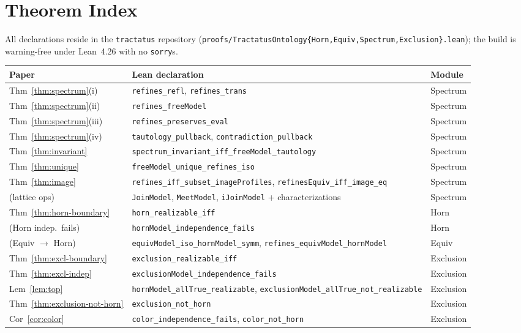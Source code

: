\documentclass[10pt, letterpaper]{article}
\theoremstyle{remark}
\newcommand{\lean}[1]{\texttt{#1}}
\begin{document}
\appendix

\section{Theorem Index}\label{app:index}

All declarations reside in the \lean{tractatus} repository
(\lean{proofs/TractatusOntology\{Horn,Equiv,Spectrum,Exclusion\}.lean});
the build is warning-free under Lean~4.26 with no \lean{sorry}s.

\begin{center}
\small
\begin{tabular}{@{}lll@{}}
\toprule
Paper & Lean declaration & Module \\
\midrule
Thm~\ref{thm:spectrum}(i) & \lean{refines\_refl}, \lean{refines\_trans} & Spectrum \\
Thm~\ref{thm:spectrum}(ii) & \lean{refines\_freeModel} & Spectrum \\
Thm~\ref{thm:spectrum}(iii) & \lean{refines\_preserves\_eval} & Spectrum \\
Thm~\ref{thm:spectrum}(iv) & \lean{tautology\_pullback}, \lean{contradiction\_pullback} & Spectrum \\
Thm~\ref{thm:invariant} & \lean{spectrum\_invariant\_iff\_freeModel\_tautology} & Spectrum \\
Thm~\ref{thm:unique} & \lean{freeModel\_unique\_refines\_iso} & Spectrum \\
Thm~\ref{thm:image} & \lean{refines\_iff\_subset\_imageProfiles}, \lean{refinesEquiv\_iff\_image\_eq} & Spectrum \\
(lattice ops) & \lean{JoinModel}, \lean{MeetModel}, \lean{iJoinModel} + characterizations & Spectrum \\
Thm~\ref{thm:horn-boundary} & \lean{horn\_realizable\_iff} & Horn \\
(Horn indep.\ fails) & \lean{hornModel\_independence\_fails} & Horn \\
(Equiv $\to$ Horn) & \lean{equivModel\_iso\_hornModel\_symm}, \lean{refines\_equivModel\_hornModel} & Equiv \\
Thm~\ref{thm:excl-boundary} & \lean{exclusion\_realizable\_iff} & Exclusion \\
Thm~\ref{thm:excl-indep} & \lean{exclusionModel\_independence\_fails} & Exclusion \\
Lem~\ref{lem:top} & \lean{hornModel\_allTrue\_realizable}, \lean{exclusionModel\_allTrue\_not\_realizable} & Exclusion \\
Thm~\ref{thm:exclusion-not-horn} & \lean{exclusion\_not\_horn} & Exclusion \\
Cor~\ref{cor:color} & \lean{color\_independence\_fails}, \lean{color\_not\_horn} & Exclusion \\
\bottomrule
\end{tabular}
\end{center}
\end{document}

